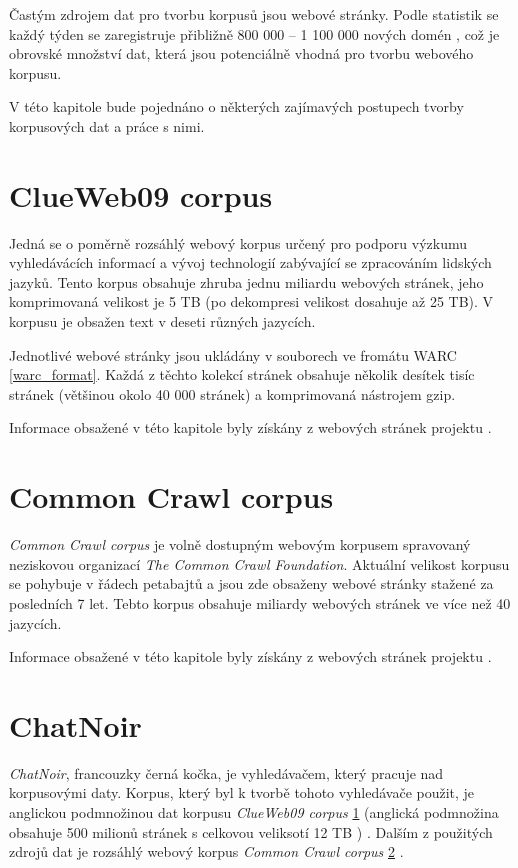 Častým zdrojem dat pro tvorbu korpusů jsou webové stránky. Podle statistik se
každý týden se zaregistruje přibližně 800 000 -- 1 100 000 nových domén \cite{NEWPAGES},
což je obrovské množství dat, která jsou potenciálně vhodná pro tvorbu webového korpusu.

V této kapitole bude pojednáno o některých zajímavých postupech tvorby korpusových dat
a práce s nimi.

\section{ClueWeb09 corpus}
\label{ClueWeb09}
Jedná se o poměrně rozsáhlý webový korpus určený pro podporu výzkumu vyhledávácích informací
a vývoj technologií zabývající se zpracováním lidských jazyků. Tento korpus obsahuje zhruba
jednu miliardu webových stránek, jeho komprimovaná velikost je 5 TB (po dekompresi velikost
dosahuje až 25 TB). V korpusu je obsažen text v deseti různých jazycích.

Jednotlivé webové stránky jsou ukládány v souborech ve fromátu WARC \ref{warc_format}.
Každá z těchto kolekcí stránek obsahuje několik desítek tisíc stránek (většinou okolo 40 000 stránek) a komprimovaná
nástrojem gzip.

Informace obsažené v této kapitole byly získány z webových stránek projektu \cite{CLUEWEB}.

\section{Common Crawl corpus}
\label{commoncrawl}
\textit{Common Crawl corpus} je volně dostupným webovým korpusem spravovaný neziskovou organizací
\textit{The Common Crawl Foundation}. Aktuální velikost korpusu se pohybuje v řádech petabajtů a
jsou zde obsaženy webové stránky stažené za posledních 7 let. Tebto korpus obsahuje miliardy
webových stránek ve více než 40 jazycích.

Informace obsažené v této kapitole byly získány z webových stránek projektu \cite{COMMONCRAWL}.

\section{ChatNoir}
\textit{ChatNoir}, francouzky černá kočka, je vyhledávačem, který pracuje nad korpusovými daty. Korpus,
který byl k tvorbě tohoto vyhledávače použit, je anglickou podmnožinou dat korpusu \textit{ClueWeb09 corpus}
\ref{ClueWeb09} (anglická podmnožina obsahuje 500 milionů stránek s celkovou veliksotí 12 TB ) \cite{CHATNOIR}.
Dalším z použitých zdrojů dat je rozsáhlý webový korpus \textit{Common Crawl corpus} \ref{commoncrawl} \cite{COMMONCRAWL_EXAMPLES}.

